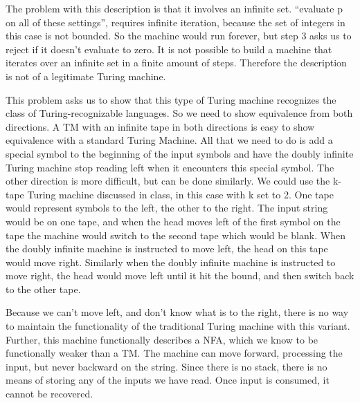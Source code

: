 \begin{problem}{4}
  \begin{solution}
    The problem with this description is that it involves an infinite set. ``evaluate p on all of these settings'',
    requires infinite iteration, because the set of integers in this case is not bounded. So the machine would run
    forever, but step 3 asks us to reject if it doesn't evaluate to zero. It is not possible to build a machine that
    iterates over an infinite set in a finite amount of steps.  Therefore the description is not of a legitimate Turing
    machine.
  \end{solution}
\end{problem}

\begin{problem}{5}
  \begin{solution}

  \end{solution}
\end{problem}

\begin{problem}{6}
  \begin{solution}
    This problem asks us to show that this type of Turing machine recognizes the class of Turing-recognizable languages.
    So we need to show equivalence from both directions.
    \br
    A TM with an infinite tape in both directions is easy to show equivalence with a standard Turing Machine.  All that
    we need to do is add a special symbol to the beginning of the input symbols and have the doubly infinite Turing
    machine stop reading left when it encounters this special symbol.
    \br
    The other direction is more difficult, but can be done similarly.  We could use the k-tape Turing machine discussed
    in class, in this case with k set to 2.  One tape would represent symbols to the left, the other to the right. The
    input string would be on one tape, and when the head moves left of the first symbol on the tape the machine would
    switch to the second tape which would be blank. When the doubly infinite machine is instructed to move left, the
    head on this tape would move right.  Similarly when the doubly infinite machine is instructed to move right, the
    head would move left until it hit the bound, and then switch back to the other tape.
  \end{solution}
\end{problem}

\begin{problem}{7}
  \begin{solution}
    Because we can't move left, and don't know what is to the right, there is no way to maintain the functionality of
    the traditional Turing machine with this variant.  Further, this machine functionally describes a NFA, which we know
    to be functionally weaker than a TM. The machine can move forward, processing the input, but never backward on the
    string. Since there is no stack, there is no means of storing any of the inputs we have read. Once input is
    consumed, it cannot be recovered.
  \end{solution}
\end{problem}

\begin{problem}{8}
  \begin{solution}

  \end{solution}
\end{problem}


